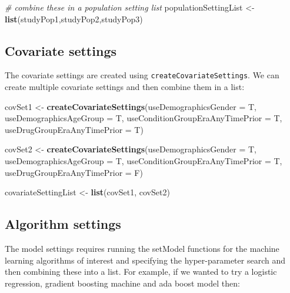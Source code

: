 \documentclass[
]{article}
\newenvironment{Shaded}{\begin{snugshade}}{\end{snugshade}}
\newcommand{\CommentTok}[1]{\textcolor[rgb]{0.56,0.35,0.01}{\textit{#1}}}
\newcommand{\DataTypeTok}[1]{\textcolor[rgb]{0.13,0.29,0.53}{#1}}
\newcommand{\KeywordTok}[1]{\textcolor[rgb]{0.13,0.29,0.53}{\textbf{#1}}}
\newcommand{\NormalTok}[1]{#1}
\newcommand{\StringTok}[1]{\textcolor[rgb]{0.31,0.60,0.02}{#1}}
\begin{document}
\begin{Shaded}
\begin{Highlighting}[]
\CommentTok{# combine these in a population setting list}
\NormalTok{populationSettingList <-}\StringTok{ }\KeywordTok{list}\NormalTok{(studyPop1,studyPop2,studyPop3)}
\end{Highlighting}
\end{Shaded}

\hypertarget{covariate-settings}{%
\subsection{Covariate settings}\label{covariate-settings}}

The covariate settings are created using
\texttt{createCovariateSettings}. We can create multiple covariate
settings and then combine them in a list:

\begin{Shaded}
\begin{Highlighting}[]
\NormalTok{covSet1 <-}\StringTok{ }\KeywordTok{createCovariateSettings}\NormalTok{(}\DataTypeTok{useDemographicsGender =}\NormalTok{ T, }
                                   \DataTypeTok{useDemographicsAgeGroup =}\NormalTok{ T, }
                                   \DataTypeTok{useConditionGroupEraAnyTimePrior =}\NormalTok{ T,}
                                   \DataTypeTok{useDrugGroupEraAnyTimePrior =}\NormalTok{ T)}

\NormalTok{covSet2 <-}\StringTok{ }\KeywordTok{createCovariateSettings}\NormalTok{(}\DataTypeTok{useDemographicsGender =}\NormalTok{ T, }
                                   \DataTypeTok{useDemographicsAgeGroup =}\NormalTok{ T, }
                                   \DataTypeTok{useConditionGroupEraAnyTimePrior =}\NormalTok{ T,}
                                   \DataTypeTok{useDrugGroupEraAnyTimePrior =}\NormalTok{ F)}

\NormalTok{covariateSettingList <-}\StringTok{ }\KeywordTok{list}\NormalTok{(covSet1, covSet2)}
\end{Highlighting}
\end{Shaded}

\hypertarget{algorithm-settings}{%
\subsection{Algorithm settings}\label{algorithm-settings}}

The model settings requires running the setModel functions for the
machine learning algorithms of interest and specifying the
hyper-parameter search and then combining these into a list. For
example, if we wanted to try a logistic regression, gradient boosting
machine and ada boost model then:
\end{document}
